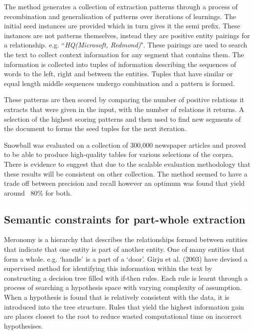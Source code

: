\documentclass{ecmm427_assignment}
\begin{document}
The method generates a collection of extraction patterns through a process of recombination and generalisation of patterns over iterations of learnings. The initial seed instances are provided which in turn gives it the semi prefix. These instances are not patterns themselves, instead they are positive entity pairings for a relationship. e.g. ``\textit{HQ(Microsoft, Redmond)}". These pairings are used to search the text to collect context information for any segment that contains them. The information is collected into tuples of information describing the sequences of words to the left, right and between the entities. Tuples that have similar or equal length middle sequences undergo combination and a pattern is formed.

These patterns are then scored by comparing the number of positive relations it extracts that were given in the input, with the number of relations it returns. A selection of the highest scoring patterns and then used to find new segments of the document to forms the seed tuples for the next iteration.

Snowball was evaluated on a collection of 300,000 newspaper articles and proved to be able to produce high-quality tables for various selections of the corpra. There is evidence to suggest that due to the scalable evaluation methodology that these results will be consistent on other collection. The method seemed to have a trade off between precision and recall however an optimum was found that yield around ~80\% for both. 

\subsection{Semantic constraints for part-whole extraction}

Meronomy is a hierarchy that describes the relationships formed between entities that indicate that one entity is part of another entity. One of many entities that form a whole. e.g. `handle' is a part of a `door'. Girju et al. (2003) have devised a supervised method for identifying this information within the text by constructing a decision tree filled with if-then rules. Each rule is learnt through a process of searching a hypothesis space with varying complexity of assumption. When a hypothesis is found that is relatively consistent with the data, it is introduced into the tree structure. Rules that yield the highest information gain are places closest to the root to reduce wasted computational time on incorrect hypothesises.
\end{document}
